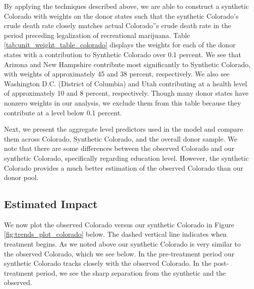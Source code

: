 \documentclass{article}
\begin{document}
By applying the techniques described above, we are able to construct a synthetic Colorado with weights on the donor states such that the synthetic Colorado's crude death rate closely matches actual Colorado''s crude death rate in the period preceding legalization of recreational marijuana. Table \ref{tab:unit_weight_table_colorado} displays the weights for each of the donor states with a contribution to Synthetic Colorado over 0.1 percent. We see that Arizona and New Hampshire contribute most significantly to Synthetic Colorado, with weights of approximately 45 and 38 percent, respectively. We also see Washington D.C. (District of Columbia) and Utah contributing at a health level of approximately 10 and 8 percent, respectively. Though many donor states have nonzero weights in our analysis, we exclude them from this table because they contribute at a level below 0.1 percent.



Next, we present the aggregate level predictors used in the model and compare them across Colorado, Synthetic Colorado, and the overall donor sample. We note that there are some differences between the observed Colorado and our synthetic Colorado, specifically regarding education level. However, the synthetic Colorado provides a much better estimation of the observed Colorado than our donor pool. 



\subsection{Estimated Impact}

We now plot the observed Colorado versus our synthetic Colorado in Figure \ref{fig:trends_plot_colorado} below. The dashed vertical line indicates when treatment begins. As we noted above our synthetic Colorado is very similar to the observed Colorado, which we see below. In the pre-treatment period our synthetic Colorado tracks closely with the observed Colorado. In the post-treatment period, we see the sharp separation from the synthetic and the observed. 
\end{document}
